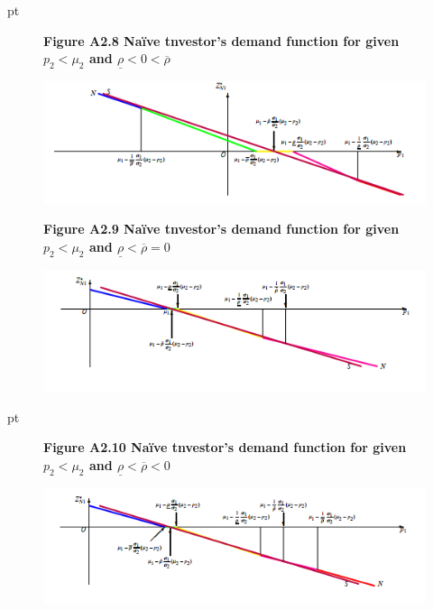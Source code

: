 \documentclass[10.0pt]{article}
\begin{document}
 pt


\begin{figure}
\centerline{\bf Figure A2.8 \quad Na\"ive tnvestor's demand function for given $ p_2 < \mu_2 $ and $ \underline{\rho} < 0 < \overline{\rho} $}
	\centering
	\includegraphics[width=1.0 \textwidth]{FigureA2.8.png}
\end{figure}





\begin{figure}
\centerline{\bf Figure A2.9 \quad Na\"ive tnvestor's demand function for given $ p_2 < \mu_2 $ and $ \underline{\rho} < \overline{\rho} = 0 $}
	\centering
	\includegraphics[width=1.0 \textwidth]{FigureA2.9.png}
\end{figure}



 pt



\begin{figure}
\centerline{\bf Figure A2.10 \quad Na\"ive tnvestor's demand function for given $ p_2 < \mu_2 $ and $ \underline{\rho} < \overline{\rho} < 0 $}
	\centering
	\includegraphics[width=1.0 \textwidth]{FigureA2.10.png}
\end{figure}
\end{document}
